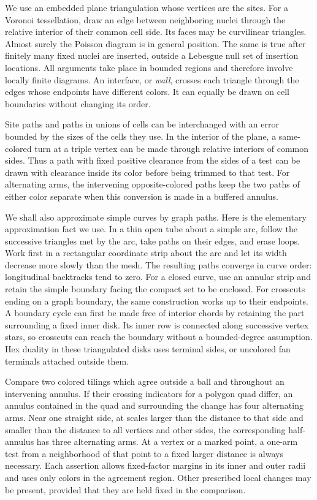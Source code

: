 We use an embedded plane triangulation whose vertices are the sites.
For a Voronoi tessellation, draw an edge between neighboring nuclei
through the relative interior of their common cell side.  Its faces may
be curvilinear triangles.  Almost surely the Poisson diagram is in
general position.  The same is true after finitely many fixed nuclei
are inserted, outside a Lebesgue null set of insertion locations.
All arguments take place in bounded regions and therefore involve
locally finite diagrams.  An interface, or \emph{wall}, crosses each
triangle through the edges whose endpoints have different colors.
It can equally be drawn on cell boundaries without changing its order.

Site paths and paths in unions of cells can be interchanged with an
error bounded by the sizes of the cells they use.  In the interior of
the plane, a same-colored turn at a triple vertex can be made through
relative interiors of common sides.  Thus a path with fixed positive
clearance from the sides of a test can be drawn with clearance inside
its color before being trimmed to that test.  For alternating arms,
the intervening opposite-colored paths keep the two paths of either
color separate when this conversion is made in a buffered annulus.

We shall also approximate simple curves by graph paths.  Here is the
elementary approximation fact we use.  In a thin open tube about a
simple arc, follow the successive triangles met by the arc, take paths
on their edges, and erase loops.  Work first in a rectangular coordinate
strip about the arc and let its width decrease more slowly than the
mesh.  The resulting paths converge in curve order: longitudinal
backtracks tend to zero.  For a closed curve, use an annular strip and
retain the simple boundary facing the compact set to be enclosed.
For crosscuts ending on a graph boundary, the same construction works
up to their endpoints.  A boundary cycle can first be made free of
interior chords by retaining the part surrounding a fixed inner disk.
Its inner row is connected along successive vertex stars, so crosscuts
can reach the boundary without a bounded-degree assumption.  Hex
duality in these triangulated disks uses terminal sides, or uncolored
fan terminals attached outside them.

\begin{lemma}\label{lem:pivotal-arms}
Compare two colored tilings which agree outside a ball and throughout
an intervening annulus.  If their crossing indicators for a polygon
quad differ, an annulus contained in the quad and surrounding the
change has four alternating arms.  Near one straight side, at scales
larger than the distance to that side and smaller than the distance
to all vertices and other sides, the corresponding half-annulus has
three alternating arms.  At a vertex or a marked point, a one-arm
test from a neighborhood of that point to a fixed larger distance is
always necessary.  Each assertion allows fixed-factor margins in its
inner and outer radii and uses only colors in the agreement region.
Other prescribed local changes may be present, provided that they
are held fixed in the comparison.
\end{lemma}

